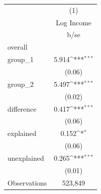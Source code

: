 {
\def\sym#1{\ifmmode^{#1}\else\(^{#1}\)\fi}
\begin{tabular}{l*{1}{c}}
\hline\hline
                    &\multicolumn{1}{c}{(1)}\\
                    &\multicolumn{1}{c}{Log Income}\\
                    &        b/se         \\
\hline
overall             &                     \\
group\_1             &       5.914\sym{***}\\
                    &      (0.06)         \\
group\_2             &       5.497\sym{***}\\
                    &      (0.02)         \\
difference          &       0.417\sym{***}\\
                    &      (0.06)         \\
explained           &       0.152\sym{*}  \\
                    &      (0.06)         \\
unexplained         &       0.265\sym{***}\\
                    &      (0.01)         \\
\hline
Observations        &     523,849         \\
\hline\hline
\end{tabular}
}
